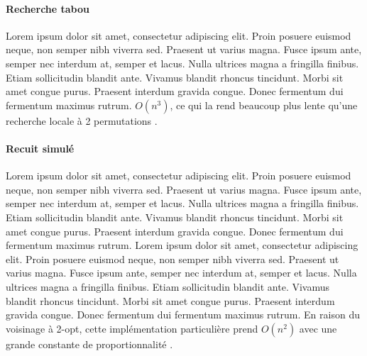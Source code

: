 \medskip

\paragraph{Recherche tabou}
Lorem ipsum dolor sit amet, consectetur adipiscing elit. Proin posuere euismod neque, non semper nibh viverra sed. Praesent ut varius magna. Fusce ipsum ante, semper nec interdum at, semper et lacus. Nulla ultrices magna a fringilla finibus. Etiam sollicitudin blandit ante. Vivamus blandit rhoncus tincidunt. Morbi sit amet congue purus. Praesent interdum gravida congue. Donec fermentum dui fermentum maximus rutrum. $O(n^3)$, ce qui la rend beaucoup plus lente qu'une recherche locale à 2 permutations \parencite{davendra_traveling_2010}.

\medskip

\paragraph{Recuit simulé}
Lorem ipsum dolor sit amet, consectetur adipiscing elit. Proin posuere euismod neque, non semper nibh viverra sed. Praesent ut varius magna. Fusce ipsum ante, semper nec interdum at, semper et lacus. Nulla ultrices magna a fringilla finibus. Etiam sollicitudin blandit ante. Vivamus blandit rhoncus tincidunt. Morbi sit amet congue purus. Praesent interdum gravida congue. Donec fermentum dui fermentum maximus rutrum. \parencite{johnson_traveling_1995} Lorem ipsum dolor sit amet, consectetur adipiscing elit. Proin posuere euismod neque, non semper nibh viverra sed. Praesent ut varius magna. Fusce ipsum ante, semper nec interdum at, semper et lacus. Nulla ultrices magna a fringilla finibus. Etiam sollicitudin blandit ante. Vivamus blandit rhoncus tincidunt. Morbi sit amet congue purus. Praesent interdum gravida congue. Donec fermentum dui fermentum maximus rutrum. En raison du voisinage à 2-opt, cette implémentation particulière prend $O(n^2)$ avec une grande constante de proportionnalité \parencite{davendra_traveling_2010}.

\medskip

